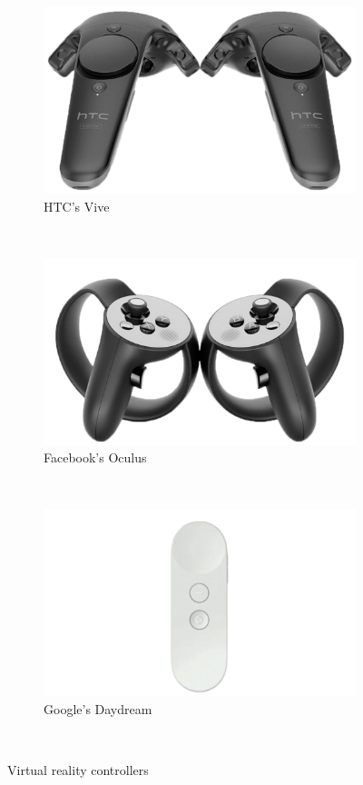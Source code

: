 \begin{figure}
  \centering
	\begin{subfigure}{.4\columnwidth}
  \includegraphics[width=\textwidth]{figures/controllerVive}
  \caption{HTC's Vive }\label{fig:controllerVive}
  \end{subfigure}
  \\
  \begin{subfigure}{.4\columnwidth}
  \includegraphics[width=\textwidth]{figures/controllerOculus}
  \caption{Facebook's Oculus}\label{fig:controllerOculus}
  \end{subfigure}
  \\
  \begin{subfigure}{.4\columnwidth}
  \includegraphics[width=\textwidth]{figures/controllerDaydream}
  \caption{Google's Daydream}\label{fig:controllerDaydream}
  \end{subfigure}
  \caption{Virtual reality controllers}
~\label{fig:controllers}

\end{figure}

